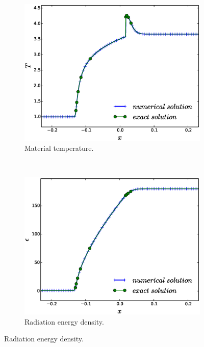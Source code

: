 \documentclass[times,doublespace]{fldauth}%
\begin{document}
%
\begin{figure}[h]
    \begin{subfigure}{0.32\textwidth}
    \centering
    \includegraphics[width=\linewidth]{figures/dpt-xs/mass-diff-mat-temp-nel-2700-plot.eps}
    \caption{Material temperature.}\label{fig:mach-3-dpt-xs-mat-temp}
    \end{subfigure}
    ~
    \begin{subfigure}{0.32\textwidth}
    \centering
    \includegraphics[width=\linewidth]{figures/dpt-xs/mass-diff-radiation-nel-2700-plot.eps}
    \caption{Radiation energy density.}\label{fig:mach-3-dpt-xs-rad-temp}
    \end{subfigure}

\end{figure}
\end{document}
